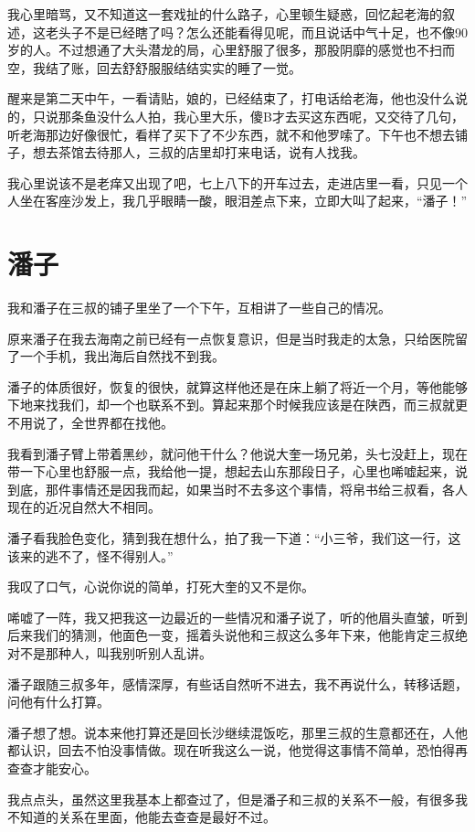我心里暗骂，又不知道这一套戏扯的什么路子，心里顿生疑惑，回忆起老海的叙述，这老头子不是已经瞎了吗？怎么还能看得见呢，而且说话中气十足，也不像90岁的人。不过想通了大头潜龙的局，心里舒服了很多，那股阴靡的感觉也不扫而空，我结了账，回去舒舒服服结结实实的睡了一觉。

醒来是第二天中午，一看请贴，娘的，已经结束了，打电话给老海，他也没什么说的，只说那条鱼没什么人拍，我心里大乐，傻B才去买这东西呢，又交待了几句，听老海那边好像很忙，看样了买下了不少东西，就不和他罗嗦了。下午也不想去铺子，想去茶馆去待那人，三叔的店里却打来电话，说有人找我。

我心里说该不是老痒又出现了吧，七上八下的开车过去，走进店里一看，只见一个人坐在客座沙发上，我几乎眼睛一酸，眼泪差点下来，立即大叫了起来，“潘子！”

\chapter{潘子}

我和潘子在三叔的铺子里坐了一个下午，互相讲了一些自己的情况。

原来潘子在我去海南之前已经有一点恢复意识，但是当时我走的太急，只给医院留了一个手机，我出海后自然找不到我。

潘子的体质很好，恢复的很快，就算这样他还是在床上躺了将近一个月，等他能够下地来找我们，却一个也联系不到。算起来那个时候我应该是在陕西，而三叔就更不用说了，全世界都在找他。

我看到潘子臂上带着黑纱，就问他干什么？他说大奎一场兄弟，头七没赶上，现在带一下心里也舒服一点，我给他一提，想起去山东那段日子，心里也唏嘘起来，说到底，那件事情还是因我而起，如果当时不去多这个事情，将帛书给三叔看，各人现在的近况自然大不相同。

潘子看我脸色变化，猜到我在想什么，拍了我一下道：“小三爷，我们这一行，这该来的逃不了，怪不得别人。”

我叹了口气，心说你说的简单，打死大奎的又不是你。

唏嘘了一阵，我又把我这一边最近的一些情况和潘子说了，听的他眉头直皱，听到后来我们的猜测，他面色一变，摇着头说他和三叔这么多年下来，他能肯定三叔绝对不是那种人，叫我别听别人乱讲。

潘子跟随三叔多年，感情深厚，有些话自然听不进去，我不再说什么，转移话题，问他有什么打算。

潘子想了想。说本来他打算还是回长沙继续混饭吃，那里三叔的生意都还在，人他都认识，回去不怕没事情做。现在听我这么一说，他觉得这事情不简单，恐怕得再查查才能安心。

我点点头，虽然这里我基本上都查过了，但是潘子和三叔的关系不一般，有很多我不知道的关系在里面，他能去查查是最好不过。


